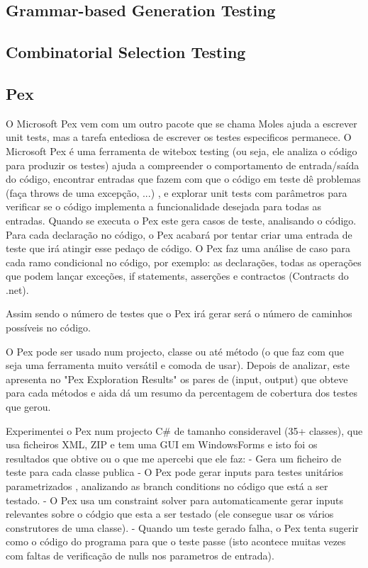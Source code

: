 \documentclass[citeauthoryear]{llncs}
\begin{document}
\subsection{Grammar-based Generation Testing}

\subsection{Combinatorial Selection Testing}

\subsection{Pex}
O Microsoft Pex vem com um outro pacote que se chama Moles ajuda a escrever unit tests, mas a tarefa entediosa de escrever os testes especificos permanece. 
O Microsoft Pex é uma ferramenta de witebox testing (ou seja, ele analiza o código para produzir os testes) ajuda a compreender o comportamento de entrada/saída do código, encontrar entradas que fazem com que o código em teste dê problemas (faça throws de uma excepção, ...) , e explorar unit tests com parâmetros para verificar se o código implementa a funcionalidade desejada para todas as entradas.
Quando se executa o Pex este gera casos de teste, analisando o código. Para cada declaração no código, o Pex acabará por tentar criar uma entrada de teste que irá atingir esse pedaço de código.
O Pex faz uma análise de caso para cada ramo condicional no código, por exemplo: as declarações, todas as operações que podem lançar exceções, if statements, asserções e contractos (Contracts do .net).

Assim sendo o número de testes que o Pex irá gerar será o número de caminhos possíveis no código.

O Pex pode ser usado num projecto, classe ou até método (o que faz com que seja uma ferramenta muito versátil e comoda de usar). Depois de analizar, este apresenta no "Pex Exploration Results" os pares de (input, output) que obteve para cada métodos e aida dá um resumo da percentagem de cobertura dos testes que gerou.

Experimentei o Pex num projecto C\# de tamanho consideravel (35+ classes), que usa ficheiros XML, ZIP e tem uma GUI em WindowsForms e isto foi os resultados que obtive ou o que me apercebi que ele faz:
- Gera um ficheiro de teste para cada classe publica
- O Pex pode gerar inputs para testes unitários parametrizados , analizando as branch conditions no código que está a ser testado.
- O Pex usa um constraint solver para automaticamente gerar inputs relevantes sobre o códgio que esta a ser testado (ele consegue usar os vários construtores de uma classe).
- Quando um teste gerado falha, o Pex tenta sugerir como o código do programa para que o teste passe (isto acontece muitas vezes com faltas de verificação de nulls nos parametros de entrada).
\end{document}

